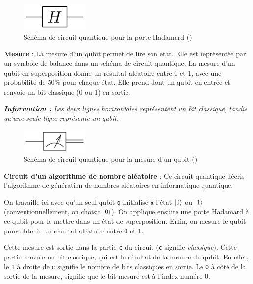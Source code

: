 \documentclass{article}
\begin{document}
\begin{figure}[H]
  \centering
  \includegraphics[width=0.3\textwidth]{img/hadamard.png}
  \caption{Schéma de circuit quantique pour la porte Hadamard (\cite{wikipediaPorteQuantique})}
\end{figure}

\textbf{Mesure} :
La mesure d'un qubit permet de lire son état. Elle est représentée par un symbole de balance dans
un schéma de circuit quantique. La mesure d'un qubit en superposition donne un résultat aléatoire
entre 0 et 1, avec une probabilité de 50\% pour chaque état. Elle prend dont un qubit en entrée et
renvoie un bit classique (0 ou 1) en sortie.

\textit{\textbf{Information :} Les deux lignes horizontales représentent un bit classique, tandis qu'une seule ligne représente un qubit.}

\begin{figure}[H]
  \centering
  \includegraphics[width=0.3\textwidth]{img/mesure.png}
  \caption{Schéma de circuit quantique pour la mesure d'un qubit (\cite{wikipediaPorteQuantique})}
\end{figure}

\textbf{Circuit d'un algorithme de nombre aléatoire} :
Ce circuit quantique décris l'algorithme de génération de nombres aléatoires en informatique quantique. 

On travaille ici avec qu'un seul qubit \texttt{q} initialisé à l'état $\ket{0}$ ou $\ket{1}$ (conventionnellement, on choisit $\ket{0}$).
On applique ensuite une porte Hadamard à ce qubit pour le mettre dans un état de superposition. 
Enfin, on mesure le qubit pour obtenir un résultat aléatoire entre 0 et 1. 

Cette mesure est sortie dans la partie \texttt{c} du circuit (\texttt{c} signifie \textit{classique}).
Cette partie renvoie un bit classique, qui est le résultat de la mesure du qubit. En effet,
le \texttt{1} à droite de \texttt{c} signifie le nombre de bits classiques en sortie. Le \texttt{0}
à côté de la sortie de la mesure, signifie que le bit mesuré est à l'index numéro 0.
\end{document}

